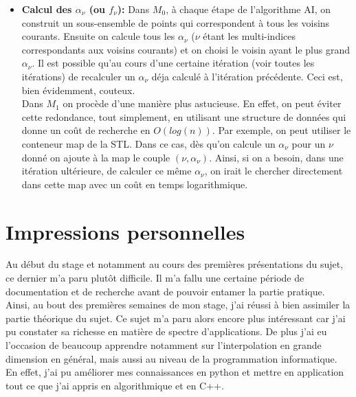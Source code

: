 \begin{itemize}
		\item \textbf{Calcul des $\alpha_{\nu}$ (ou $f_{\nu}$):} Dans $M_0$, à chaque étape de l'algorithme AI, on construit un sous-ensemble de points
		qui correspondent à tous les voisins courants. Ensuite on calcule tous les $\alpha_{\nu}$ ($\nu$ étant les multi-indices correspondants aux voisins courants)
		et on choisi le voisin ayant le plus grand $\alpha_{\nu}$. Il est possible qu'au cours d'une certaine itération (voir toutes les itérations)
		de recalculer un $\alpha_{\nu}$ déja calculé à l'itération précédente. Ceci est, bien évidemment, couteux. \\
		Dans $M_1$ on procède d'une manière plus astucieuse. En effet, on peut éviter cette redondance, tout simplement, en utilisant une structure de données
		qui donne un coût de recherche en $O(log(n))$. Par exemple, on peut utiliser le conteneur map de la STL. Dans ce cas, dès qu'on calcule un $\alpha_{\nu}$ pour
		un $\nu$ donné on ajoute à la map le couple $(\nu, \alpha_{\nu})$. Ainsi, si on a besoin, dans une itération ultérieure, de calculer ce même $\alpha_{\nu}$,
		on irait le chercher directement dans cette map avec un coût en temps logarithmique.
\end{itemize}

\section{Impressions personnelles}\label{sec:7}
\hspace{0.5cm}
Au début du stage et notamment au cours des premières présentations du sujet, ce dernier m'a paru
plutôt difficile. Il m'a fallu une certaine période de documentation et de recherche avant de pouvoir entamer la partie pratique.
Ainsi, au bout des premières semaines de mon stage, j'ai réussi à bien assimiler la partie théorique du sujet.
Ce sujet m'a paru alors encore plus intéressant car j'ai pu constater sa richesse en matière de spectre d'applications. De plus j'ai eu l'occasion
de beaucoup apprendre notamment sur l'interpolation en grande dimension en général, mais aussi au niveau de la programmation informatique. En effet, j'ai
pu améliorer mes connaissances en python et mettre en application tout ce que j'ai appris en algorithmique et en C++.\\


